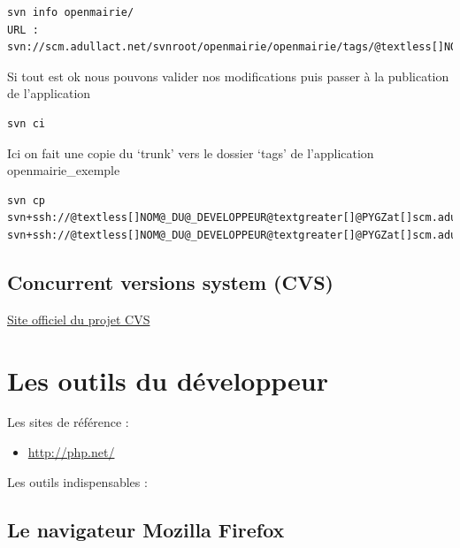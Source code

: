 \documentclass[letterpaper,10pt,french]{manual}
\begin{document}
\begin{Verbatim}[commandchars=@\[\]]
svn info openmairie/
URL : svn://scm.adullact.net/svnroot/openmairie/openmairie/tags/@textless[]NOUVELLE@_VERSION@textgreater[]
\end{Verbatim}

Si tout est ok nous pouvons valider nos modifications puis passer à la
publication de l'application

\begin{Verbatim}[commandchars=@\[\]]
svn ci
\end{Verbatim}

Ici on fait une copie du `trunk' vers le dossier `tags' de l'application
openmairie\_exemple

\begin{Verbatim}[commandchars=@\[\]]
svn cp svn+ssh://@textless[]NOM@_DU@_DEVELOPPEUR@textgreater[]@PYGZat[]scm.adullact.net/openmairie/openmairie@_exemple/trunk svn+ssh://@textless[]NOM@_DU@_DEVELOPPEUR@textgreater[]@PYGZat[]scm.adullact.net/openmairie/openmairie@_exemple/tags/@textless[]NOUVELLE@_VERSION@textgreater[]
\end{Verbatim}

\resetcurrentobjects
\hypertarget{--doc-versions/cvs}{}

\hypertarget{cvs}{}\subsection{Concurrent versions system (CVS)}

\href{http://www.nongnu.org/cvs/}{Site officiel du projet CVS}

\resetcurrentobjects
\hypertarget{--doc-outils/index}{}

\hypertarget{outils}{}\section{Les outils du développeur}

Les sites de référence :
\begin{itemize}
\item {} 
\href{http://php.net/}{http://php.net/}

\end{itemize}

Les outils indispensables :

\resetcurrentobjects
\hypertarget{--doc-outils/firefox}{}

\hypertarget{firefox}{}\subsection{Le navigateur Mozilla Firefox}
\end{document}

